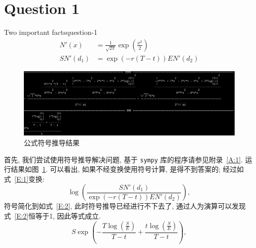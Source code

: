 \section{Question 1}
\begin{statebox}{Two important facts}{question-1}
    \begin{align*}
        N'(x) &= \frac{1}{\sqrt{2\pi}}\exp\left(\frac{x^2}{2}\right) \\
        SN'(d_1) &= \exp\left(-r(T-t)\right)EN'(d_2)
    \end{align*}
\end{statebox}

\begin{figure}[H]
    \centering
    \includegraphics[width=\textwidth]{figures/2019-11-14-derivation-1}
    \caption{公式符号推导结果}\label{F:derivation-1}
\end{figure}

首先, 我们尝试使用符号推导解决问题, 基于 \texttt{sympy} 库的程序请参见附录~\ref{A:1}. 运行结果如图~\ref{F:derivation-1}. 可以看出, 如果不经变换使用符号计算, 是得不到答案的; 经过如式~\eqref{E:1}变换:
\begin{equation}\label{E:1}
    \log\left(\frac{SN'(d_1)}{\exp\left(-r(T-t)\right)EN'(d_2)}\right),
\end{equation}
符号简化到如式~\eqref{E:2}, 此时符号推导已经进行不下去了, 通过人为演算可以发现式~\eqref{E:2}恒等于1, 因此等式成立.
\begin{equation}\label{E:2}
    S\exp\left(-\frac{T\log\left(\frac{S}{E}\right)}{T-t} + \frac{t\log\left(\frac{S}{E}\right)}{T-t}\right),
\end{equation}

